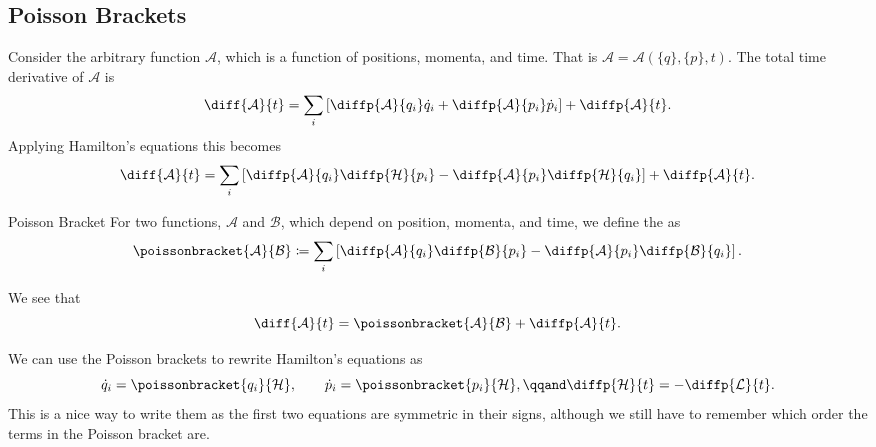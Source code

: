 \documentclass[fleqn]{NotesClass}
\newcommand*{\lagrangian}{\mathcal{L}}
\newcommand*{\hamiltonian}{\mathcal{H}}
\begin{document}
    \subsection{Poisson Brackets}
    Consider the arbitrary function \(\mathcal{A}\), which is a function of positions, momenta, and time.
    That is \(\mathcal{A} = \mathcal{A}(\{q\}, \{p\}, t)\).
    The total time derivative of \(\mathcal{A}\) is
    \begin{equation}
        \diff{\mathcal{A}}{t} = \sum_i \left[ \diffp{\mathcal{A}}{q_i}\dot{q}_i + \diffp{\mathcal{A}}{p_i}\dot{p}_i \right] + \diffp{\mathcal{A}}{t}.
    \end{equation}
    Applying Hamilton's equations this becomes
    \begin{equation}
        \diff{\mathcal{A}}{t} = \sum_i \left[ \diffp{\mathcal{A}}{q_i}\diffp{\hamiltonian}{p_i} - \diffp{\mathcal{A}}{p_i}\diffp{\hamiltonian}{q_i} \right] + \diffp{\mathcal{A}}{t}.
    \end{equation}
    
    \begin{dfn}{Poisson Bracket}{}
        For two functions, \(\mathcal{A}\) and \(\mathcal{B}\), which depend on position, momenta, and time, we define the  as
        \begin{equation}
            \poissonbracket{\mathcal{A}}{\mathcal{B}} \coloneqq \sum_i \left[ \diffp{\mathcal{A}}{q_i}\diffp{\mathcal{B}}{p_i} - \diffp{\mathcal{A}}{p_i}\diffp{\mathcal{B}}{q_i} \right].
        \end{equation}
    \end{dfn}

    We see that 
    \begin{equation}\label{eqn:dA/dt = poisson bracket}
        \diff{\mathcal{A}}{t} = \poissonbracket{\mathcal{A}}{\mathcal{B}} + \diffp{\mathcal{A}}{t}.
    \end{equation}
    
    We can use the Poisson brackets to rewrite Hamilton's equations as
    \begin{equation}
        \dot{q}_i = \poissonbracket{q_i}{\hamiltonian}, \qquad \dot{p}_i = \poissonbracket{p_i}{\hamiltonian}, \qqand \diffp{\hamiltonian}{t} = - \diffp{\lagrangian}{t}.
    \end{equation}
    This is a nice way to write them as the first two equations are symmetric in their signs, although we still have to remember which order the terms in the Poisson bracket are.
    
\end{document}
